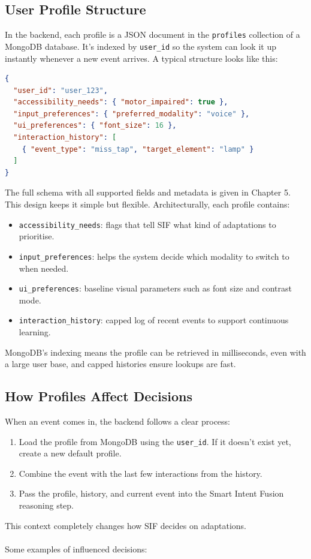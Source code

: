 \documentclass[openany]{book}
\begin{document}
\subsection{User Profile Structure}
In the backend, each profile is a JSON document in the \texttt{profiles} collection of a MongoDB database. It’s indexed by \texttt{user\_id} so the system can look it up instantly whenever a new event arrives. A typical structure looks like this:

\begin{lstlisting}[language=json, caption=Simplified User Profile Example]
{
  "user_id": "user_123",
  "accessibility_needs": { "motor_impaired": true },
  "input_preferences": { "preferred_modality": "voice" },
  "ui_preferences": { "font_size": 16 },
  "interaction_history": [
    { "event_type": "miss_tap", "target_element": "lamp" }
  ]
}
\end{lstlisting}
The full schema with all supported fields and metadata is given in Chapter 5.
\newpage
This design keeps it simple but flexible. Architecturally, each profile contains:
\begin{itemize}
    \item \texttt{accessibility\_needs}: flags that tell SIF what kind of adaptations to prioritise.
    \item \texttt{input\_preferences}: helps the system decide which modality to switch to when needed.
    \item \texttt{ui\_preferences}: baseline visual parameters such as font size and contrast mode.
    \item \texttt{interaction\_history}: capped log of recent events to support continuous learning.
\end{itemize}
MongoDB’s indexing means the profile can be retrieved in milliseconds, even with a large user base, and capped histories ensure lookups are fast.

\subsection{How Profiles Affect Decisions}
When an event comes in, the backend follows a clear process:
\begin{enumerate}
    \item Load the profile from MongoDB using the \texttt{user\_id}. If it doesn’t exist yet, create a new default profile.
    \item Combine the event with the last few interactions from the history.
    \item Pass the profile, history, and current event into the Smart Intent Fusion reasoning step.
\end{enumerate}
This context completely changes how SIF decides on adaptations.\\\\
Some examples of influenced decisions:
\end{document}
